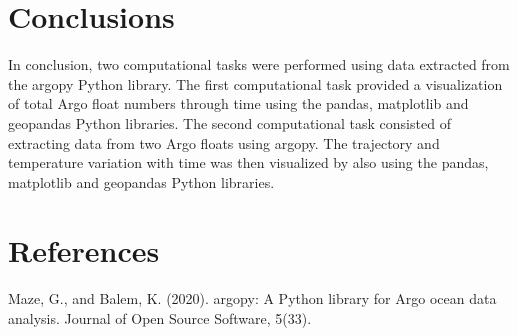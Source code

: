 \documentclass{article}
\begin{document}
 

\section{Conclusions}

In conclusion, two computational tasks were performed using data extracted from the argopy Python library. The first computational task provided a visualization of total Argo float numbers through time using the pandas, matplotlib and geopandas Python libraries. The second computational task consisted of extracting data from two Argo floats using argopy. The trajectory and temperature variation with time was then visualized by also using the pandas, matplotlib and geopandas Python libraries.

\section{References}

Maze, G., and Balem, K. (2020). argopy: A Python library for Argo ocean data analysis. Journal of Open Source Software, 5(33).
\end{document}
